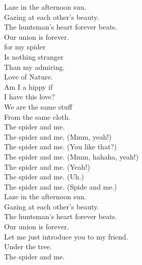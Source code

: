 Laze in the afternoon sun. \\
Gazing at each other's beauty. \\
The huntsman's heart forever beats. \\
Our union is forever. \\

 for my spider \\
Is nothing stranger \\
Than my admiring. \\
Love of Nature. \\
Am I a hippy if \\
I have this love? \\
We are the same stuff \\
From the same cloth. \\

The spider and me. \\
The spider and me. (Mmm, yeah!) \\
The spider and me. (You like that?) \\
The spider and me. (Mmm, hahaha, yeah!) \\
The spider and me. (Yeah!) \\
The spider and me. (Uh.) \\
The spider and me. (Spide and me.) \\

Laze in the afternoon sun. \\
Gazing at each other's beauty. \\
The huntsman's heart forever beats. \\
Our union is forever. \\

Let me just introduce you to my friend. \\
Under the tree. \\
The spider and me. \\










